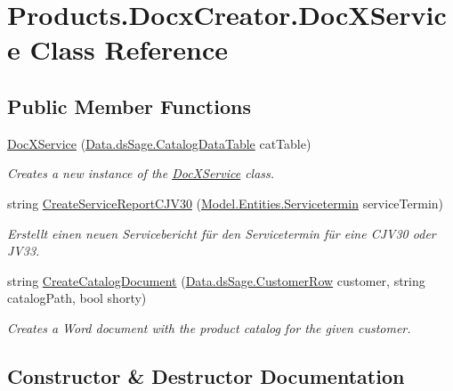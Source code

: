 \hypertarget{class_products_1_1_docx_creator_1_1_doc_x_service}{}\section{Products.\+Docx\+Creator.\+Doc\+X\+Service Class Reference}
\label{class_products_1_1_docx_creator_1_1_doc_x_service}
\subsection*{Public Member Functions}
\begin{DoxyCompactItemize}
\item 
\hyperlink{class_products_1_1_docx_creator_1_1_doc_x_service_a11799f42301f701f870b3da2e06e1c8a}{Doc\+X\+Service} (\hyperlink{class_products_1_1_data_1_1ds_sage_1_1_catalog_data_table}{Data.\+ds\+Sage.\+Catalog\+Data\+Table} cat\+Table)
\begin{DoxyCompactList}\small\item\em Creates a new instance of the \hyperlink{class_products_1_1_docx_creator_1_1_doc_x_service}{Doc\+X\+Service} class. \end{DoxyCompactList}\item 
string \hyperlink{class_products_1_1_docx_creator_1_1_doc_x_service_a86ffeb61dab494edfbb7c1805d52b0af}{Create\+Service\+Report\+C\+J\+V30} (\hyperlink{class_products_1_1_model_1_1_entities_1_1_servicetermin}{Model.\+Entities.\+Servicetermin} service\+Termin)
\begin{DoxyCompactList}\small\item\em Erstellt einen neuen Servicebericht für den Servicetermin für eine C\+J\+V30 oder J\+V33. \end{DoxyCompactList}\item 
string \hyperlink{class_products_1_1_docx_creator_1_1_doc_x_service_a6653ffa493139a8392fa6d8f68edb9a1}{Create\+Catalog\+Document} (\hyperlink{class_products_1_1_data_1_1ds_sage_1_1_customer_row}{Data.\+ds\+Sage.\+Customer\+Row} customer, string catalog\+Path, bool shorty)
\begin{DoxyCompactList}\small\item\em Creates a Word document with the product catalog for the given customer. \end{DoxyCompactList}\end{DoxyCompactItemize}


\subsection{Constructor \& Destructor Documentation}
